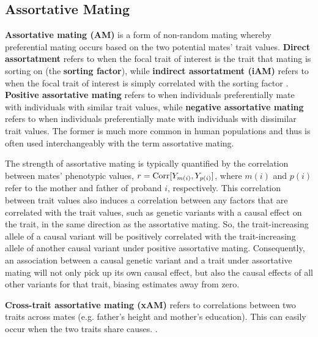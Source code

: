 \documentclass[12pt]{article}
\begin{document}

\subsection{Assortative Mating}
\textbf{Assortative mating (AM)} is a form of non-random mating whereby preferential mating occurs based on the two potential mates' trait values.
\textbf{Direct assortatment} refers to when the focal trait of interest is the trait that mating is sorting on (the \textbf{sorting factor}), while \textbf{indirect assortatment (iAM)} refers to when the focal trait of interest is simply correlated with the sorting factor \citep{Sunde2025NatComm}.
\textbf{Positive assortative mating} refers to when individuals preferentially mate with individuals with similar trait values, while \textbf{negative assortative mating} refers to when individuals preferentially mate with individuals with dissimilar trait values.
The former is much more common in human populations and thus is often used interchangeably with the term assortative mating.

The strength of assortative mating is typically quantified by the correlation between mates' phenotypic values, $r = \mathrm{Corr}[Y_{m(i)}, Y_{p(i)}] $, where $m(i)$ and $p(i)$ refer to the mother and father of proband $i$, respectively.
This correlation between trait values also induces a correlation between any factors that are correlated with the trait values, such as genetic variants with a causal effect on the trait, in the same direction as the assortative mating.
So, the trait-increasing allele of a causal variant will be positively correlated with the trait-increasing allele of another causal variant under positive assortative mating.
Consequently, an association between a causal genetic variant and a trait under assortative mating will not only pick up its own causal effect, but also the causal effects of all other variants for that trait, biasing estimates away from zero. 


\textbf{Cross-trait assortative mating (xAM)} refers to correlations between two traits across mates (e.g. father's height and mother's education).
This can easily occur when the two traits share causes.
.
\end{document}
